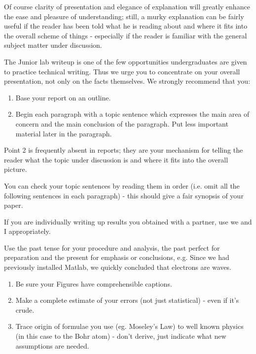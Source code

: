 \documentclass[aps,twocolumn,secnumarabic,nobalancelastpage,amsmath,amssymb,nofootinbib]{revtex4}
\begin{document}
Of course clarity of presentation and elegance of explanation will
greatly enhance the ease and pleasure of understanding; still, a
murky explanation can be fairly useful if the reader has been told
what he is reading about and where it fits into the overall scheme
of things - especially if the reader is familiar with the general
subject matter under discussion.

The Junior lab writeup is one of the few opportunities
undergraduates are given to practice technical writing. Thus we urge
you to concentrate on your overall presentation, not only on the
facts themselves. We strongly recommend that you:
\begin{enumerate}
\item Base your report on an outline.
\item Begin each paragraph with a topic sentence which expresses the
main area of concern and the main conclusion of the paragraph. Put
less important material later in the paragraph.
\end{enumerate}

Point 2 is frequently absent in reports; they are your
mechanism for telling the reader what the topic under discussion is
and where it fits into the overall picture.

You can check your topic sentences by reading them in order (i.e.
omit all the following sentences in each paragraph) - this should
give a fair synopsis of your paper.

If you are individually writing up results you obtained with a
partner, use we and I appropriately.

Use the past tense for your procedure and analysis, the past perfect
for preparation and the present for emphasis or conclusions, e.g.
Since we had previously installed Matlab, we quickly concluded that
electrons are waves.

\begin{enumerate}
\item Be sure your Figures have comprehensible captions.

\item Make a complete estimate of your errors (not just statistical) - even
if it's crude.

\item Trace origin of formulae you use (eg. Moseley's Law) to well known
physics (in this case to the Bohr atom) - don't derive, just
indicate what new assumptions are needed.
\end{enumerate}
\end{document}
